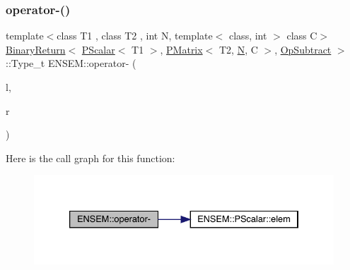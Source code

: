 \subsubsection{\texorpdfstring{operator-\/()}{operator-()}\hspace{0.1cm}{\footnotesize\ttfamily [4/4]}}
{\footnotesize\ttfamily template$<$class T1 , class T2 , int N, template$<$ class, int $>$ class C$>$ \\
\mbox{\hyperlink{structENSEM_1_1BinaryReturn}{Binary\+Return}}$<$ \mbox{\hyperlink{classENSEM_1_1PScalar}{P\+Scalar}}$<$ T1 $>$, \mbox{\hyperlink{classENSEM_1_1PMatrix}{P\+Matrix}}$<$ T2, \mbox{\hyperlink{adat__devel_2lib_2hadron_2operator__name__util_8cc_a7722c8ecbb62d99aee7ce68b1752f337}{N}}, C $>$, \mbox{\hyperlink{structENSEM_1_1OpSubtract}{Op\+Subtract}} $>$\+::Type\+\_\+t E\+N\+S\+E\+M\+::operator-\/ (\begin{DoxyParamCaption}\item[{const \mbox{\hyperlink{classENSEM_1_1PScalar}{P\+Scalar}}$<$ T1 $>$ \&}]{l,  }\item[{const \mbox{\hyperlink{classENSEM_1_1PMatrix}{P\+Matrix}}$<$ T2, \mbox{\hyperlink{adat__devel_2lib_2hadron_2operator__name__util_8cc_a7722c8ecbb62d99aee7ce68b1752f337}{N}}, C $>$ \&}]{r }\end{DoxyParamCaption})\hspace{0.3cm}{\ttfamily [inline]}}

Here is the call graph for this function\+:\nopagebreak
\begin{figure}[H]
\begin{center}
\leavevmode
\includegraphics[width=333pt]{df/d0a/group__primmatrix_ga6f60741d61098ca196a5f733f86a5835_cgraph}
\end{center}
\end{figure}
\mbox{\label{group__primmatrix_ga1b00e76a765453dfbb33f0630bd863c3}} 
